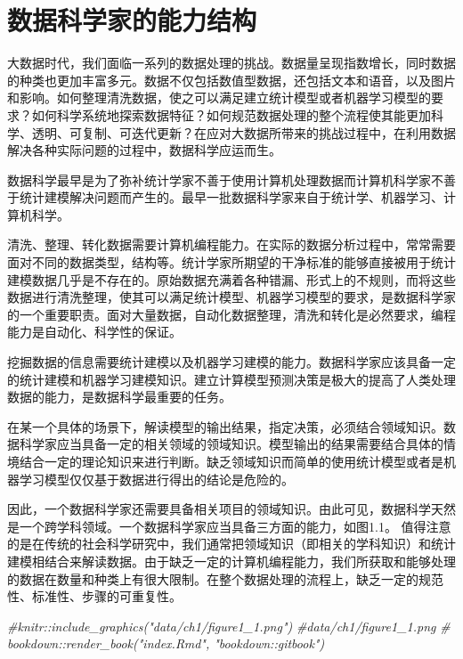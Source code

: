 \documentclass[]{book}
\newenvironment{Shaded}{\begin{snugshade}}{\end{snugshade}}
\newcommand{\CommentTok}[1]{\textcolor[rgb]{0.56,0.35,0.01}{\textit{#1}}}
\begin{document}
\hypertarget{ux6570ux636eux79d1ux5b66ux5bb6ux7684ux80fdux529bux7ed3ux6784}{%
\section{数据科学家的能力结构}\label{ux6570ux636eux79d1ux5b66ux5bb6ux7684ux80fdux529bux7ed3ux6784}}

大数据时代，我们面临一系列的数据处理的挑战。数据量呈现指数增长，同时数据的种类也更加丰富多元。数据不仅包括数值型数据，还包括文本和语音，以及图片和影响。如何整理清洗数据，使之可以满足建立统计模型或者机器学习模型的要求？如何科学系统地探索数据特征？如何规范数据处理的整个流程使其能更加科学、透明、可复制、可迭代更新？在应对大数据所带来的挑战过程中，在利用数据解决各种实际问题的过程中，数据科学应运而生。

数据科学最早是为了弥补统计学家不善于使用计算机处理数据而计算机科学家不善于统计建模解决问题而产生的。最早一批数据科学家来自于统计学、机器学习、计算机科学。

清洗、整理、转化数据需要计算机编程能力。在实际的数据分析过程中，常常需要面对不同的数据类型，结构等。统计学家所期望的干净标准的能够直接被用于统计建模数据几乎是不存在的。原始数据充满着各种错漏、形式上的不规则，而将这些数据进行清洗整理，使其可以满足统计模型、机器学习模型的要求，是数据科学家的一个重要职责。面对大量数据，自动化数据整理，清洗和转化是必然要求，编程能力是自动化、科学性的保证。

挖掘数据的信息需要统计建模以及机器学习建模的能力。数据科学家应该具备一定的统计建模和机器学习建模知识。建立计算模型预测决策是极大的提高了人类处理数据的能力，是数据科学最重要的任务。

在某一个具体的场景下，解读模型的输出结果，指定决策，必须结合领域知识。数据科学家应当具备一定的相关领域的领域知识。模型输出的结果需要结合具体的情境结合一定的理论知识来进行判断。缺乏领域知识而简单的使用统计模型或者是机器学习模型仅仅基于数据进行得出的结论是危险的。

因此，一个数据科学家还需要具备相关项目的领域知识。由此可见，数据科学天然是一个跨学科领域。一个数据科学家应当具备三方面的能力，如图1.1。
值得注意的是在传统的社会科学研究中，我们通常把领域知识（即相关的学科知识）和统计建模相结合来解读数据。由于缺乏一定的计算机编程能力，我们所获取和能够处理的数据在数量和种类上有很大限制。在整个数据处理的流程上，缺乏一定的规范性、标准性、步骤的可重复性。

\begin{Shaded}
\begin{Highlighting}[]
\CommentTok{#knitr::include_graphics("data/ch1/figure1_1.png")}
\CommentTok{#data/ch1/figure1_1.png}
\CommentTok{# bookdown::render_book("index.Rmd", "bookdown::gitbook")}
\end{Highlighting}
\end{Shaded}
\end{document}
